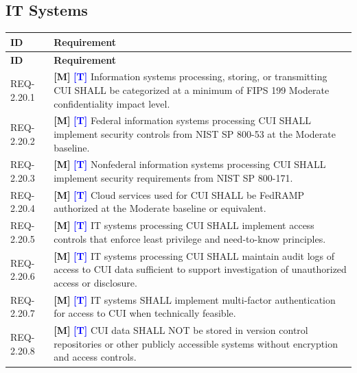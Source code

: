 \documentclass[11pt,letterpaper]{article}
\begin{document}
\subsection{IT Systems}

\begin{longtable}{@{}p{1.4cm}p{11.6cm}@{}}
\toprule
\textbf{ID} & \textbf{Requirement} \\
\midrule
\endfirsthead
\toprule
\textbf{ID} & \textbf{Requirement} \\
\midrule
\endhead

REQ-2.20.1 & \textcolor{mandatory}{\textbf{[M]}} \textcolor{blue}{\textbf{[T]}} Information systems processing, storing, or transmitting CUI SHALL be categorized at a minimum of FIPS 199 Moderate confidentiality impact level. \\[6pt]

REQ-2.20.2 & \textcolor{mandatory}{\textbf{[M]}} \textcolor{blue}{\textbf{[T]}} Federal information systems processing CUI SHALL implement security controls from NIST SP 800-53 at the Moderate baseline. \\[6pt]

REQ-2.20.3 & \textcolor{mandatory}{\textbf{[M]}} \textcolor{blue}{\textbf{[T]}} Nonfederal information systems processing CUI SHALL implement security requirements from NIST SP 800-171. \\[6pt]

REQ-2.20.4 & \textcolor{mandatory}{\textbf{[M]}} \textcolor{blue}{\textbf{[T]}} Cloud services used for CUI SHALL be FedRAMP authorized at the Moderate baseline or equivalent. \\[6pt]

REQ-2.20.5 & \textcolor{mandatory}{\textbf{[M]}} \textcolor{blue}{\textbf{[T]}} IT systems processing CUI SHALL implement access controls that enforce least privilege and need-to-know principles. \\[6pt]

REQ-2.20.6 & \textcolor{mandatory}{\textbf{[M]}} \textcolor{blue}{\textbf{[T]}} IT systems processing CUI SHALL maintain audit logs of access to CUI data sufficient to support investigation of unauthorized access or disclosure. \\[6pt]

REQ-2.20.7 & \textcolor{mandatory}{\textbf{[M]}} \textcolor{blue}{\textbf{[T]}} IT systems SHALL implement multi-factor authentication for access to CUI when technically feasible. \\[6pt]

REQ-2.20.8 & \textcolor{mandatory}{\textbf{[M]}} \textcolor{blue}{\textbf{[T]}} CUI data SHALL NOT be stored in version control repositories or other publicly accessible systems without encryption and access controls. \\[6pt]

\bottomrule
\end{longtable}
\end{document}
